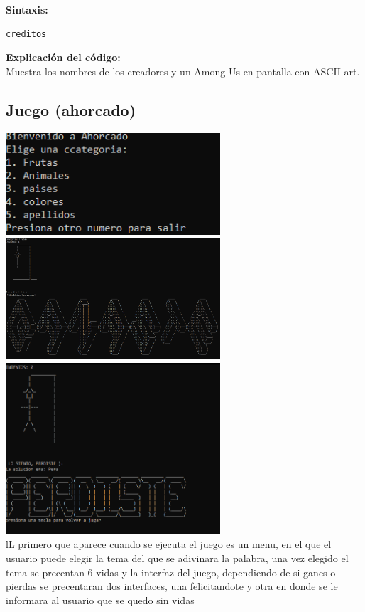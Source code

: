 \documentclass[12pt,a4paper]{article}
\begin{document}
    \newpage
    \noindent
    \justifying
    \textbf{Sintaxis:}
    \begin{lstlisting}[style=BashInputStyle]
creditos
    \end{lstlisting}
    \textbf{Explicación del código:} \\
    Muestra los nombres de los creadores y un Among Us en pantalla con ASCII art.

 
\justifying
\subsection{Juego (ahorcado)}
  \centering
    \includegraphics[width=8cm]{img/ahorcado1.png}\\
     \includegraphics[width=8cm]{img/ahorcado2.png}\\
      \includegraphics[width=8cm]{img/ahorcado3.png}\\
    \justifying
    \noindent
    lL primero que aparece cuando se ejecuta el juego es un menu, en el que el usuario puede elegir la tema del que se adivinara la palabra, una vez elegido el tema se precentan 6 vidas y la interfaz del juego, dependiendo de si ganes o pierdas se precentaran dos interfaces, una felicitandote y otra en donde se le informara al usuario que se quedo sin vidas
\end{document}
